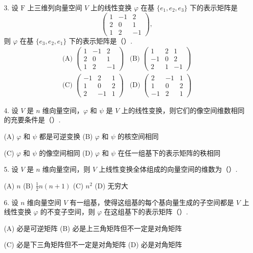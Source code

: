 \documentclass[UTF8,12pt,a4paper,fontset=fandol]{ctexart}
\begin{document}
3. 设 $\mathrm{F}$ 上三维列向量空间 $V$ 上的线性变换 $\varphi$ 在基 $\{e_1,e_2,e_3\}$ 下的表示矩阵是
\[
\left(\begin{array}{rrr}
1 & -1 & 2\\
2 & 0 & 1\\
1 & 2 & -1
\end{array}\right),
\]
则 $\varphi$ 在基 $\{e_3,e_2,e_1\}$ 下的表示矩阵是（\quad）.
\[
\begin{array}{ll}
\text{(A) }\left(\begin{array}{rrr}1&-1&2\\2&0&1\\1&2&-1\end{array}\right)
&
\text{(B) }\left(\begin{array}{rrr}1&2&1\\-1&0&2\\2&1&-1\end{array}\right)
\\[1.2em]
\text{(C) }\left(\begin{array}{rrr}-1&2&1\\1&0&2\\2&-1&1\end{array}\right)
&
\text{(D) }\left(\begin{array}{rrr}2&-1&1\\1&0&2\\-1&2&1\end{array}\right)
\end{array}
\]

4. 设 $V$ 是 $n$ 维向量空间，$\varphi$ 和 $\psi$ 是 $V$ 上的线性变换，则它们的像空间维数相同的充要条件是（\quad）.

(A) $\varphi$ 和 $\psi$ 都是可逆变换 \hfill (B) $\varphi$ 和 $\psi$ 的核空间相同

(C) $\varphi$ 和 $\psi$ 的像空间相同 \hfill (D) $\varphi$ 和 $\psi$ 在任一组基下的表示矩阵的秩相同

5. 设 $V$ 是 $n$ 维向量空间，则 $V$ 上线性变换全体组成的向量空间的维数为（\quad）.

(A) $n$ \hfill (B) $\frac12n(n+1)$ \hfill (C) $n^2$ \hfill (D) 无穷大

6. 设 $n$ 维向量空间 $V$ 有一组基，使得这组基的每个基向量生成的子空间都是 $V$ 上线性变换 $\varphi$ 的不变子空间，则 $\varphi$ 在这组基下的表示矩阵（\quad）.

(A) 必是可逆矩阵 \hfill (B) 必是上三角矩阵但不一定是对角矩阵

(C) 必是下三角矩阵但不一定是对角矩阵 \hfill (D) 必是对角矩阵
\end{document}
